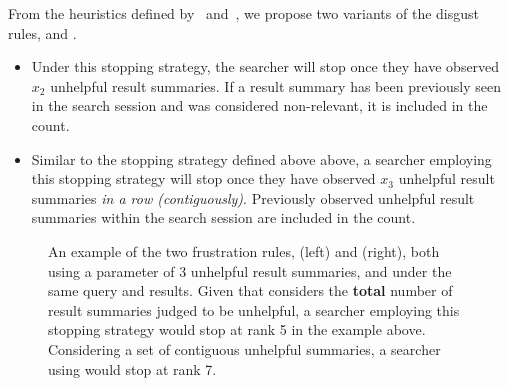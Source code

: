 From the heuristics defined by~\citealt{cooper1973retrieval_effectiveness_ii} and~\citealt{kraft1979stopping_rules}, we propose two variants of the disgust rules,  and .

\begin{itemize}
    
    \item[]{} Under this stopping strategy, the searcher will stop once they have observed $x_2$ unhelpful result summaries. If a result summary has been previously seen in the search session and was considered non-relevant, it is included in the count.
    
    \item[]{} Similar to the stopping strategy defined above above, a searcher employing this stopping strategy will stop once they have observed $x_3$ unhelpful result summaries \emph{in a row (contiguously)}. Previously observed unhelpful result summaries within the search session are included in the count.
    
\end{itemize}

\begin{figure}[t!]
    \centering
    \caption[Examples of frustration rules  and ]{An example of the two frustration rules,  (left) and  (right), both using a parameter of 3 unhelpful result summaries, and under the same query and results. Given that  considers the \textbf{total} number of result summaries judged to be unhelpful, a searcher employing this stopping strategy would stop at rank 5 in the example above. Considering a set of contiguous unhelpful summaries, a searcher using  would stop at rank 7.}
    \label{fig:ss23}
\end{figure}

